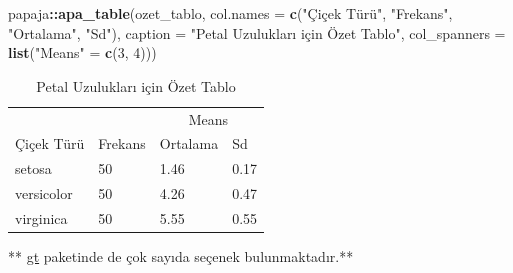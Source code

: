 \documentclass[
  oneside]{book}
\newenvironment{Shaded}{\begin{snugshade}}{\end{snugshade}}
\newcommand{\AttributeTok}[1]{\textcolor[rgb]{0.13,0.29,0.53}{#1}}
\newcommand{\DecValTok}[1]{\textcolor[rgb]{0.00,0.00,0.81}{#1}}
\newcommand{\FunctionTok}[1]{\textcolor[rgb]{0.13,0.29,0.53}{\textbf{#1}}}
\newcommand{\NormalTok}[1]{#1}
\newcommand{\OtherTok}[1]{\textcolor[rgb]{0.56,0.35,0.01}{#1}}
\newcommand{\SpecialCharTok}[1]{\textcolor[rgb]{0.81,0.36,0.00}{\textbf{#1}}}
\newcommand{\StringTok}[1]{\textcolor[rgb]{0.31,0.60,0.02}{#1}}
\begin{document}
\begin{Shaded}
\begin{Highlighting}[]
\NormalTok{papaja}\SpecialCharTok{::}\FunctionTok{apa\_table}\NormalTok{(ozet\_tablo,}
                  \AttributeTok{col.names =} \FunctionTok{c}\NormalTok{(}\StringTok{"Çiçek Türü"}\NormalTok{, }\StringTok{"Frekans"}\NormalTok{, }\StringTok{"Ortalama"}\NormalTok{, }\StringTok{"Sd"}\NormalTok{),}
                  \AttributeTok{caption =} \StringTok{"Petal Uzulukları için Özet Tablo"}\NormalTok{,}
                  \AttributeTok{col\_spanners =} \FunctionTok{list}\NormalTok{(}\StringTok{"Means"} \OtherTok{=} \FunctionTok{c}\NormalTok{(}\DecValTok{3}\NormalTok{, }\DecValTok{4}\NormalTok{)))}
\end{Highlighting}
\end{Shaded}

\begin{table}[tbp]

\begin{center}
\begin{threeparttable}

\caption{\label{tab:papaja-demo}Petal Uzulukları için Özet Tablo}

\begin{tabular}{llll}
\toprule
 &  & \multicolumn{2}{c}{Means} \\
\cmidrule(r){3-4}
Çiçek Türü & Frekans & Ortalama & Sd\\
\midrule
setosa & 50 & 1.46 & 0.17\\
versicolor & 50 & 4.26 & 0.47\\
virginica & 50 & 5.55 & 0.55\\
\bottomrule
\end{tabular}

\end{threeparttable}
\end{center}

\end{table}

\leavevmode{}%
** \href{https://gt.rstudio.com/index.html}{gt} paketinde de çok sayıda seçenek bulunmaktadır.**
\end{document}
